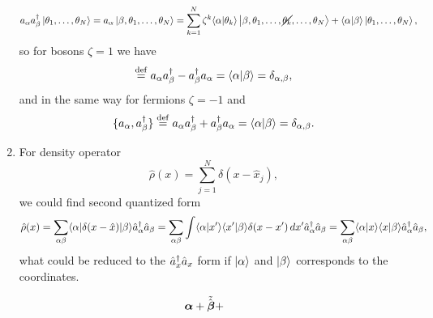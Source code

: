 \begin{enumerate}
\begin{align*}
		a_\alpha a_\beta\D \ket{\theta_1,\ldots,\theta_N} &= a_\alpha \ket{\beta,\theta_1,\ldots,\theta_N} = \sum_{k=1}^{N} \zeta^{k} \bk{\alpha}{\theta_k} \ket{\beta,\theta_1,\ldots,\cancel{\theta_k},\ldots,\theta_N} + \bk{\alpha}{\beta} \ket{\theta_1,\ldots,\theta_N},
	\end{align*}
	so for bosons $\zeta=1$ we have
	\begin{equation*}
		[a_\alpha, a_\beta\D] \overset{\mathrm{def}}{=} a_\alpha a_\beta\D - a_\beta\D a_\alpha = \bk{\alpha}{\beta} = \delta_{\alpha,\beta},
	\end{equation*}
	and in the same way for fermions $\zeta=-1$ and
	\begin{equation*}
		\{a_\alpha, a_\beta\D\} \overset{\mathrm{def}}{=} a_\alpha a_\beta\D + a_\beta\D a_\alpha = \bk{\alpha}{\beta} = \delta_{\alpha,\beta}.
	\end{equation*}
	\item For density operator 
	\begin{equation*}
		\hat{\rho}(x) = \sum_{j=1}^{N} \delta(x-\hat{x}_j),
	\end{equation*}
	we could find second quantized form
	\begin{equation*}
		\hat{\rho}(x) = \sum_{\alpha \beta} \bk{\alpha}[\delta(x-\hat{x})]{\beta} \hat{a}_\alpha\D \hat{a}_\beta = \sum_{\alpha \beta} \int
		\bk{\alpha}{x'} \bk{x'}{\beta} \delta(x-x') \d x' \hat{a}_\alpha\D \hat{a}_\beta = \sum_{\alpha \beta} \bk{\alpha}{x} \bk{x}{\beta} \hat{a}_\alpha\D \hat{a}_\beta,
	\end{equation*}
	what could be reduced to the $\hat{a}_x^{\dag} \hat{a}_x$ form if $\left| \alpha \right\rangle$ and $\left| \beta \right\rangle$ corresponds to the coordinates.
\end{enumerate}

\begin{equation*}
	\boldsymbol{\alpha} + \tilde{\hat{\boldsymbol{\beta}}} + 
\end{equation*}